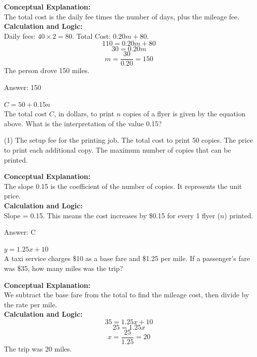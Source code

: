 \documentclass[11pt,paper=a4,answers]{exam}
\begin{document}
\begin{questions}
\begin{solution}
\textbf{Conceptual Explanation:} \\
The total cost is the daily fee times the number of days, plus the mileage fee.
\\[10pt]
\textbf{Calculation and Logic:} \\
Daily fees: $40 \times 2 = 80$.
Total Cost: $0.20m + 80$.
\[110 = 0.20m + 80\]
\[30 = 0.20m\]
\[m = \frac{30}{0.20} = 150\]
The person drove 150 miles.

\vspace{15pt}
Answer: \colorbox{yellow!100}{150}
\end{solution}

\question
$C = 50 + 0.15n$ \\
The total cost $C$, in dollars, to print $n$ copies of a flyer is given by the equation above. What is the interpretation of the value 0.15?
\begin{tasks}(1)
    \task The setup fee for the printing job.
    \task The total cost to print 50 copies.
    \task The price to print each additional copy.
    \task The maximum number of copies that can be printed.
\end{tasks}

\begin{solution}
\textbf{Conceptual Explanation:} \\
The slope 0.15 is the coefficient of the number of copies. It represents the unit price.
\\[10pt]
\textbf{Calculation and Logic:} \\
Slope = 0.15. 
This means the cost increases by \$0.15 for every 1 flyer ($n$) printed.

\vspace{15pt}
Answer: \colorbox{yellow!100}{C}
\end{solution}

\question
$y = 1.25x + 10$ \\
A taxi service charges \$10 as a base fare and \$1.25 per mile. If a passenger's fare was \$35, how many miles was the trip?

\begin{solution}
\textbf{Conceptual Explanation:} \\
We subtract the base fare from the total to find the mileage cost, then divide by the rate per mile.
\\[10pt]
\textbf{Calculation and Logic:} \\
\[35 = 1.25x + 10\]
\[25 = 1.25x\]
\[x = \frac{25}{1.25} = 20\]
The trip was 20 miles.


\end{solution}
\end{questions}
\end{document}
